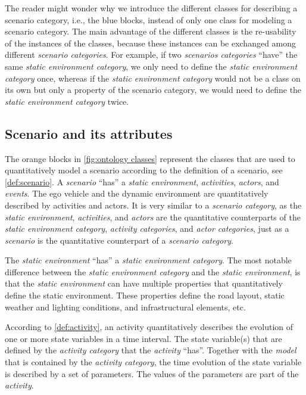 
The reader might wonder why we introduce the different classes for describing a scenario category, i.e., the blue blocks, instead of only one class for modeling a scenario category. 
The main advantage of the different classes is the re-usability of the instances of the classes, because these instances can be exchanged among different \textit{scenario categories}. For example, if two \textit{scenarios categories} ``have'' the same \textit{static environment category}, we only need to define the \textit{static environment category} once, whereas if the \textit{static environment category} would not be a class on its own but only a property of the scenario category, we would need to define the \textit{static environment category} twice.



\subsection{Scenario and its attributes}
\label{sec:domain scenario}

The orange blocks in \cref{fig:ontology classes} represent the classes that are used to quantitatively model a scenario according to the definition of a scenario, see \cref{def:scenario}. A \textit{scenario} ``has'' a \textit{static environment}, \textit{activities}, \textit{actors}, and \textit{events}. 
The ego vehicle and the dynamic environment are quantitatively described by activities and actors. 
It is very similar to a \textit{scenario category}, as the \textit{static environment}, \textit{activities}, and \textit{actors} are the quantitative counterparts of the \textit{static environment category}, \textit{activity categories}, and \textit{actor categories}, just as a \textit{scenario} is the quantitative counterpart of a \textit{scenario category}. 

The \textit{static environment} ``has'' a \textit{static environment category}. The most notable difference between the \textit{static environment category} and the \textit{static environment}, is that the \textit{static environment} can have multiple properties that quantitatively define the static environment. These properties define the road layout, static weather and lighting conditions, and infrastructural elements, etc.

According to \cref{def:activity}, an activity quantitatively describes the evolution of \cstart one or more state variables \cend in a time interval. The state \cstart variable(s) \cend that are defined by the \textit{activity category} that the \textit{activity} ``has''. Together with the \textit{model} that is contained by the \textit{activity category}, the time evolution of the state \cstart variable \cend is described by a set of parameters. The values of the parameters are part of the \textit{activity}. 

